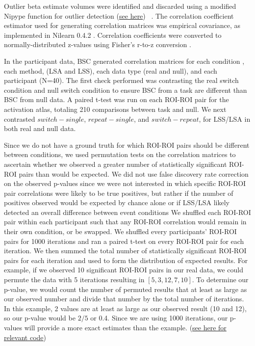 \documentclass[10pt,letterpaper]{article}
\begin{document}
Outlier beta estimate volumes were identified and discarded using a
modified Nipype function for outlier detection
(\href{https://github.com/HBClab/NiBetaSeries/blob/a45c0a1f/src/nibetaseries/interfaces/nilearn.py#L153}{see here}) ~\cite{Crosby1994}.
The correlation coefficient estimator used for generating correlation matrices
was empirical covariance, as implemented in Nilearn 0.4.2
\cite{Abraham2014}.
Correlation coefficients were converted to normally-distributed z-values using
Fisher's r-to-z conversion \cite{Fisher1915}.

In the participant data, BSC generated correlation matrices for each condition ,
each method, (LSA and LSS), each data type (real and null), and each participant (N=40).
The first check performed was contrasting the real switch condition and null switch condition
to ensure BSC from a task are different than BSC from null data.
A paired t-test was run on each ROI-ROI pair for the activation atlas, totaling 210 comparisons
between task and null.
We next contrasted $switch - single$, $repeat - single$, and $switch - repeat$, for LSS/LSA in both
real and null data.

Since we do not have a ground truth for which ROI-ROI pairs should be different between conditions,
we used permutation tests on the correlation matrices to ascertain whether we observed a greater number
of statistically significant ROI-ROI pairs than would be expected.
We did not use false discovery rate correction on the observed p-values since we were not interested in
which specific ROI-ROI pair correlations were likely to be true positives, but rather if the number of positives
observed would be expected by chance alone or if LSS/LSA likely detected an overall difference between event conditions
We shuffled each ROI-ROI pair within each participant such that any ROI-ROI correlation would remain
in their own condition, or be swapped.
We shuffled every participants' ROI-ROI pairs for 1000 iterations and ran a paired t-test on every ROI-ROI pair
for each iteration.
We then summed the total number of statistically significant ROI-ROI pairs for each iteration and used
to form the distribution of expected results.
For example, if we observed 10 significant ROI-ROI pairs in our real data, we could permute the data
with 5 iterations resulting in $[5, 3, 12, 7, 10]$.
To determine our p-value, we would count the number of permuted results that at least as large as
our observed number and divide that number by the total number of iterations.
In this example, 2 values are at least as large as our observed result (10 and 12), so our
p-value would be $2/5$ or 0.4.
Since we are using 1000 iterations, our p-values will provide a more exact estimates than the example.
(\href{https://github.com/jdkent/BetaSeriesRealDataAnalysis/blob/90fafb5b83b2e1bfade61a9fb1a87f225efaa95f/nibsAnalysis/BetaSeriesAnalysis.ipynb}{see here for relevant code})
\end{document}
